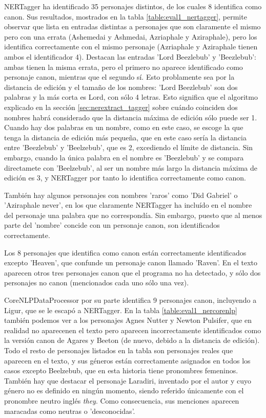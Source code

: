 \documentclass{pre-tfg}
\begin{document}
NERTagger ha identificado 35 personajes distintos, de los cuales 8 identifica como canon. Sus resultados, mostrados en la tabla \ref{table:eval1_nertagger}, permite observar que lista en entradas distintas a personajes que son claramente el mismo pero con una errata (Ashemedai y Ashmedai, Azriaphale y Aziraphale), pero los identifica correctamente con el mismo personaje (Azriaphale y Aziraphale tienen ambos el identificador 4). Destacan las entradas 'Lord Beezlebub' y 'Beezlebub': ambas tienen la misma errata, pero el primero no aparece identificado como personaje canon, mientras que el segundo sí. Esto problamente sea por la distancia de edición y el tamaño de los nombres: 'Lord Beezlebub' son dos palabras y la más corta es Lord, con sólo 4 letras. Esto significa que el algoritmo explicado en la sección \ref{sec:nerextract_tagger} sobre cuándo coinciden dos nombres habrá considerado que la distancia máxima de edición sólo puede ser 1. Cuando hay dos palabras en un nombre, como en este caso, se escoge la que tenga la distancia de edición más pequeña, que en este caso sería la distancia entre 'Beezlebub' y 'Beelzebub',  que es 2, excediendo el límite de distancia. Sin embargo, cuando la única palabra en el nombre es 'Beezlebub' y se compara directamete con 'Beelzebub', al ser un nombre más largo la distancia máxima de edición es 3, y NERTagger por tanto lo identifica correctamente como canon.

También hay algunos personajes con nombres 'raros' como 'Did Gabriel' o 'Aziraphale never', en los que claramente NERTagger ha incluído en el nombre del personaje una palabra que no correspondía. Sin embargo, puesto que al menos parte del 'nombre' concide con un personaje canon, son identificados correctamente.

Los 8 personajes que identifica como canon están correctamente identificados excepto 'Heaven', que confunde un personaje canon llamado 'Raven'. En el texto aparecen otros tres personajes canon que el programa no ha detectado, y sólo dos personajes no canon (mencionados cada uno sólo una vez).

CoreNLPDataProcessor por su parte identifica 9 personajes canon, incluyendo a Ligur, que se le escapó a NERTagger. En la tabla \ref{table:eval1_nercorenlp} también podemos ver a los personajes Agnes Nutter y Newton Pulsifer, que en realidad no aparecenen el texto pero aparecen incorrectamente identificados como la versión canon de Agares y Beeton (de nuevo, debido a la distancia de edición). Todo el resto de personajes listados en la tabla son personajes reales que aparecen en el texto, y sus géneros están correctamente asignados en todos los casos excepto Beelzebub, que en esta historia tiene pronombres femeninos. También hay que destacar el personaje Laradiri, inventado por el autor y cuyo género no es definido en ningún momento, siendo referido únicamente con el pronombre neutro inglés \textit{they}. Como consecuencia, sus menciones aparecen maracadas como neutras o 'desconocidas'.
\end{document}
